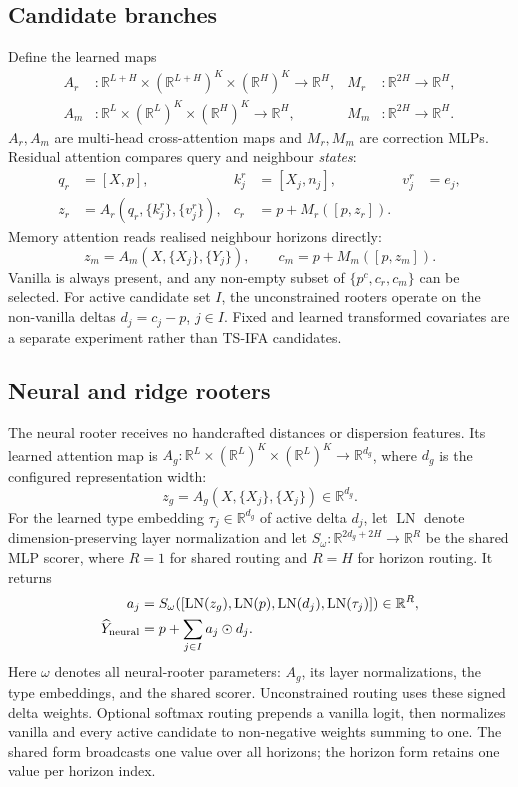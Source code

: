 \documentclass[10pt]{article}
\newcommand{\reals}{\mathbb{R}}
\begin{document}
\subsection{Candidate branches}

Define the learned maps
\begin{align*}
 A_r&:\reals^{L+H}\times(\reals^{L+H})^K\times(\reals^H)^K\to\reals^H,
 &M_r&:\reals^{2H}\to\reals^H,\\
 A_m&:\reals^L\times(\reals^L)^K\times(\reals^H)^K\to\reals^H,
 &M_m&:\reals^{2H}\to\reals^H.
\end{align*}
$A_r,A_m$ are multi-head cross-attention maps and $M_r,M_m$ are correction
MLPs. Residual attention compares query and neighbour \emph{states}:
\begin{align}
 q_r&=[X,p],& k_j^r&=[X_j,n_j],& v_j^r&=e_j,\\
 z_r&=A_r(q_r,\{k_j^r\},\{v_j^r\}),&
 c_r&=p+M_r([p,z_r]).
\end{align}
Memory attention reads realised neighbour horizons directly:
\[
 z_m=A_m(X,\{X_j\},\{Y_j\}),
 \qquad c_m=p+M_m([p,z_m]).
\]
Vanilla is always present, and any non-empty subset of
$\{p^c,c_r,c_m\}$ can be selected. For active candidate set $I$, the
unconstrained rooters operate on the non-vanilla deltas $d_j=c_j-p$, $j\in I$.
Fixed and learned transformed covariates are a
separate experiment rather than TS-IFA candidates.

\subsection{Neural and ridge rooters}

The neural rooter receives no handcrafted distances or dispersion features.
Its learned attention map is
$A_g:\reals^L\times(\reals^L)^K\times(\reals^L)^K\to\reals^{d_g}$,
where $d_g$ is the configured representation width:
\[
 z_g=A_g(X,\{X_j\},\{X_j\})\in\reals^{d_g}.
\]
For the learned type embedding $\tau_j\in\reals^{d_g}$ of active delta $d_j$,
let $\operatorname{LN}$ denote dimension-preserving layer normalization and
let $S_\omega:\reals^{2d_g+2H}\to\reals^R$ be the shared MLP scorer, where
$R=1$ for shared routing and $R=H$ for horizon routing. It returns
\begin{align}
 a_j&=S_\omega\!\left([
 \operatorname{LN}(z_g),\operatorname{LN}(p),
 \operatorname{LN}(d_j),\operatorname{LN}(\tau_j)
 ]\right)\in\reals^R,\\
 \widehat Y_{\rm neural}&=p+\sum_{j\in I}a_j\odot d_j.
\end{align}
Here $\omega$ denotes all neural-rooter parameters: $A_g$, its layer
normalizations, the type embeddings, and the shared scorer.
Unconstrained routing uses these signed delta weights. Optional softmax routing
prepends a vanilla logit, then normalizes vanilla and every active candidate to
non-negative weights summing to one. The shared form broadcasts one value over
all horizons; the horizon form retains one value per horizon index.
\end{document}
